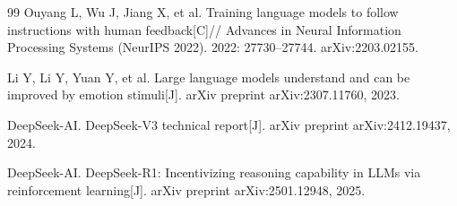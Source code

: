 \documentclass[11pt,a4paper]{article}
\begin{document}
\begin{thebibliography}{99}
Ouyang L, Wu J, Jiang X, et al.
Training language models to follow instructions with human feedback[C]//
Advances in Neural Information Processing Systems (NeurIPS 2022). 2022: 27730--27744.
arXiv:2203.02155.
 
Li Y, Li Y, Yuan Y, et al.
Large language models understand and can be improved by emotion stimuli[J].
arXiv preprint arXiv:2307.11760, 2023.
 
DeepSeek-AI.
DeepSeek-V3 technical report[J]. arXiv preprint arXiv:2412.19437, 2024.
 
DeepSeek-AI.
DeepSeek-R1: Incentivizing reasoning capability in LLMs via reinforcement learning[J].
arXiv preprint arXiv:2501.12948, 2025.
 
\end{thebibliography}
 
\end{document}
